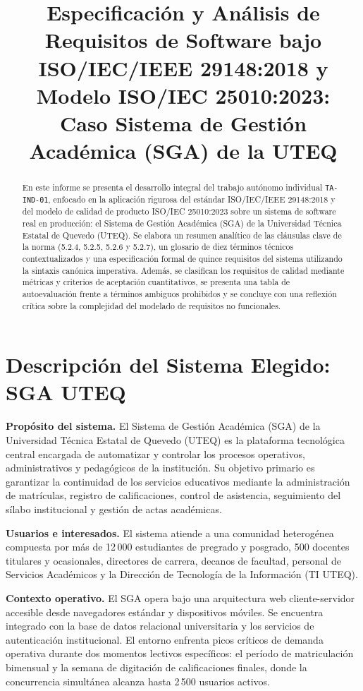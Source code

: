 \documentclass[conference]{IEEEtran}
\title{Especificación y Análisis de Requisitos de Software bajo ISO/IEC/IEEE 29148:2018 y Modelo ISO/IEC 25010:2023:\\Caso Sistema de Gestión Académica (SGA) de la UTEQ}
\author{
	\IEEEauthorblockN{José Ignacio Gilces Carranza}
	\IEEEauthorblockA{Universidad Técnica Estatal de Quevedo (UTEQ) --- Facultad de Ciencias de la Computación\\
		Ingeniería de Software $\cdot$ Ingeniería de Requerimientos (ISR-401) $\cdot$ Trabajo Autónomo Individual TA-IND-01}
}
\begin{document}
	\onecolumn
	\maketitle
	
	\begin{abstract}
		En este informe se presenta el desarrollo integral del trabajo autónomo individual \texttt{TA-IND-01}, enfocado en la aplicación rigurosa del estándar ISO/IEC/IEEE 29148:2018 y del modelo de calidad de producto ISO/IEC 25010:2023 sobre un sistema de software real en producción: el Sistema de Gestión Académica (SGA) de la Universidad Técnica Estatal de Quevedo (UTEQ). Se elabora un resumen analítico de las cláusulas clave de la norma (5.2.4, 5.2.5, 5.2.6 y 5.2.7), un glosario de diez términos técnicos contextualizados y una especificación formal de quince requisitos del sistema utilizando la sintaxis canónica imperativa. Además, se clasifican los requisitos de calidad mediante métricas y criterios de aceptación cuantitativos, se presenta una tabla de autoevaluación frente a términos ambiguos prohibidos y se concluye con una reflexión crítica sobre la complejidad del modelado de requisitos no funcionales.
	\end{abstract}
	
	\section{Descripción del Sistema Elegido: SGA UTEQ}
	\noindent\textbf{Propósito del sistema.} El Sistema de Gestión Académica (SGA) de la Universidad Técnica Estatal de Quevedo (UTEQ) es la plataforma tecnológica central encargada de automatizar y controlar los procesos operativos, administrativos y pedagógicos de la institución. Su objetivo primario es garantizar la continuidad de los servicios educativos mediante la administración de matrículas, registro de calificaciones, control de asistencia, seguimiento del sílabo institucional y gestión de actas académicas.
	
	\noindent\textbf{Usuarios e interesados.} El sistema atiende a una comunidad heterogénea compuesta por más de 12\,000 estudiantes de pregrado y posgrado, 500 docentes titulares y ocasionales, directores de carrera, decanos de facultad, personal de Servicios Académicos y la Dirección de Tecnología de la Información (TI UTEQ).
	
	\noindent\textbf{Contexto operativo.} El SGA opera bajo una arquitectura web cliente-servidor accesible desde navegadores estándar y dispositivos móviles. Se encuentra integrado con la base de datos relacional universitaria y los servicios de autenticación institucional. El entorno enfrenta picos críticos de demanda operativa durante dos momentos lectivos específicos: el período de matriculación bimensual y la semana de digitación de calificaciones finales, donde la concurrencia simultánea alcanza hasta 2\,500 usuarios activos.
	
\end{document}
